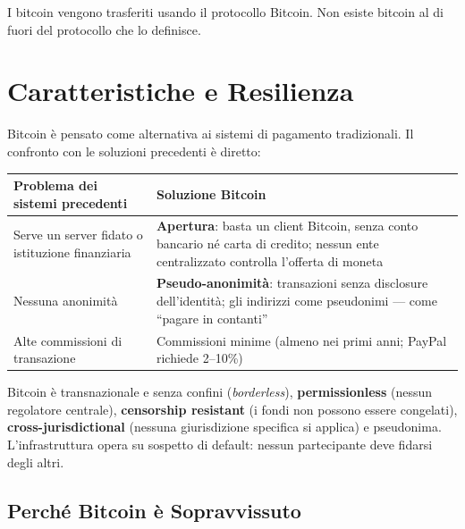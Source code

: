 \documentclass[
  italian,
  openany]{book}
\newcounter{none} %
\begin{document}
I bitcoin vengono trasferiti usando il protocollo Bitcoin. Non esiste
bitcoin al di fuori del protocollo che lo definisce.

\section{Caratteristiche e
Resilienza}\label{caratteristiche-e-resilienza}

Bitcoin è pensato come alternativa ai sistemi di pagamento tradizionali.
Il confronto con le soluzioni precedenti è diretto:

{\def\LTcaptype{none} %
\begin{longtable}[]{@{}
  >{\raggedright\arraybackslash}p{}
  >{\raggedright\arraybackslash}p{}@{}}
\toprule\noalign{}
\begin{minipage}[b]{\linewidth}\raggedright
Problema dei sistemi precedenti
\end{minipage} & \begin{minipage}[b]{\linewidth}\raggedright
Soluzione Bitcoin
\end{minipage} \\
\midrule\noalign{}
\endhead
\bottomrule\noalign{}
\endlastfoot
Serve un server fidato o istituzione finanziaria & \textbf{Apertura}:
basta un client Bitcoin, senza conto bancario né carta di credito;
nessun ente centralizzato controlla l'offerta di moneta \\
Nessuna anonimità & \textbf{Pseudo-anonimità}: transazioni senza
disclosure dell'identità; gli indirizzi come pseudonimi --- come
``pagare in contanti'' \\
Alte commissioni di transazione & Commissioni minime (almeno nei primi
anni; PayPal richiede 2--10\%) \\
\end{longtable}
}

Bitcoin è transnazionale e senza confini (\emph{borderless}),
\textbf{permissionless} (nessun regolatore centrale), \textbf{censorship
resistant} (i fondi non possono essere congelati),
\textbf{cross-jurisdictional} (nessuna giurisdizione specifica si
applica) e pseudonima. L'infrastruttura opera su sospetto di default:
nessun partecipante deve fidarsi degli altri.

\subsection{Perché Bitcoin è
Sopravvissuto}\label{perchuxe9-bitcoin-uxe8-sopravvissuto}
\end{document}
